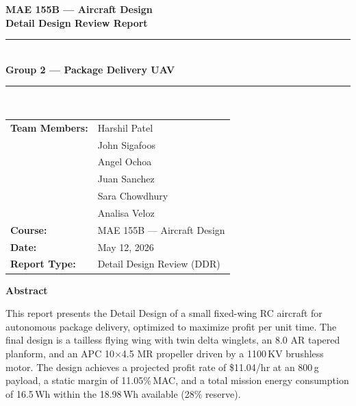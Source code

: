 \documentclass[10pt]{article}
\begin{document}
\begin{titlepage}
\centering
\vspace*{2cm}
{\LARGE \textbf{MAE 155B --- Aircraft Design}} \\[0.4cm]
{\Large \textbf{Detail Design Review Report}} \\[0.8cm]
\rule{\linewidth}{0.5pt} \\[0.4cm]
{\large \textbf{Group 2 --- Package Delivery UAV}} \\[0.4cm]
\rule{\linewidth}{0.5pt} \\[0.8cm]

\begin{tabular}{ll}
\textbf{Team Members:} & Harshil Patel \\
                       & John Sigafoos \\
                       & Angel Ochoa \\
                       & Juan Sanchez \\
                       & Sara Chowdhury \\
                       & Analisa Veloz \\[0.5cm]
\textbf{Course:}       & MAE 155B --- Aircraft Design \\
\textbf{Date:}         & May 12, 2026 \\
\textbf{Report Type:}  & Detail Design Review (DDR) \\
\end{tabular}

\vspace{1.5cm}
\textbf{Abstract} \\[0.2cm]
\begin{minipage}{0.85\linewidth}
\normalsize
This report presents the Detail Design of a small fixed-wing RC aircraft for autonomous
package delivery, optimized to maximize profit per unit time. The final design is a
tailless flying wing with twin delta winglets, an 8.0 AR tapered planform, and an
APC 10$\times$4.5 MR propeller driven by a 1100\,KV brushless motor. The
design achieves a projected profit rate of \$11.04/hr at an 800\,g payload,
a static margin of 11.05\%\,MAC, and a total mission energy consumption of
16.5\,Wh within the 18.98\,Wh available (28\% reserve).
\end{minipage}
\end{titlepage}

\end{document}
